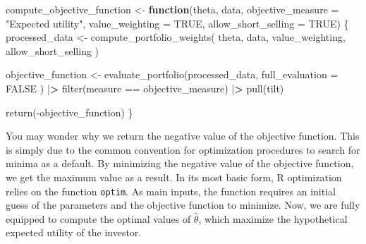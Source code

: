 \documentclass[
]{book}
\newenvironment{Shaded}{\begin{snugshade}}{\end{snugshade}}
\newcommand{\AttributeTok}[1]{\textcolor[rgb]{0.61,0.61,0.61}{#1}}
\newcommand{\ConstantTok}[1]{\textcolor[rgb]{0,0,0}{#1}}
\newcommand{\ControlFlowTok}[1]{\textcolor[rgb]{0.27,0.27,0.27}{\textbf{#1}}}
\newcommand{\ErrorTok}[1]{\textcolor[rgb]{0.14,0.14,0.14}{\textbf{#1}}}
\newcommand{\FunctionTok}[1]{\textcolor[rgb]{0,0,0}{#1}}
\newcommand{\NormalTok}[1]{#1}
\newcommand{\OtherTok}[1]{\textcolor[rgb]{0.37,0.37,0.37}{#1}}
\newcommand{\SpecialCharTok}[1]{\textcolor[rgb]{0,0,0}{#1}}
\newcommand{\StringTok}[1]{\textcolor[rgb]{0.5,0.5,0.5}{#1}}
\begin{document}
\begin{Shaded}
\begin{Highlighting}[]
\NormalTok{compute\_objective\_function }\OtherTok{\textless{}{-}} \ControlFlowTok{function}\NormalTok{(theta,}
\NormalTok{                                       data,}
                                       \AttributeTok{objective\_measure =} \StringTok{"Expected utility"}\NormalTok{,}
                                       \AttributeTok{value\_weighting =} \ConstantTok{TRUE}\NormalTok{,}
                                       \AttributeTok{allow\_short\_selling =} \ConstantTok{TRUE}\NormalTok{) \{}
\NormalTok{  processed\_data }\OtherTok{\textless{}{-}} \FunctionTok{compute\_portfolio\_weights}\NormalTok{(}
\NormalTok{    theta,}
\NormalTok{    data,}
\NormalTok{    value\_weighting,}
\NormalTok{    allow\_short\_selling}
\NormalTok{  )}

\NormalTok{  objective\_function }\OtherTok{\textless{}{-}} \FunctionTok{evaluate\_portfolio}\NormalTok{(processed\_data,}
    \AttributeTok{full\_evaluation =} \ConstantTok{FALSE}
\NormalTok{  ) }\SpecialCharTok{|}\ErrorTok{\textgreater{}}
    \FunctionTok{filter}\NormalTok{(measure }\SpecialCharTok{==}\NormalTok{ objective\_measure) }\SpecialCharTok{|}\ErrorTok{\textgreater{}}
    \FunctionTok{pull}\NormalTok{(tilt)}

  \FunctionTok{return}\NormalTok{(}\SpecialCharTok{{-}}\NormalTok{objective\_function)}
\NormalTok{\}}
\end{Highlighting}
\end{Shaded}

You may wonder why we return the negative value of the objective function. This is simply due to the common convention for optimization procedures to search for minima as a default. By minimizing the negative value of the objective function, we get the maximum value as a result.
In its most basic form, R optimization relies on the function \texttt{optim}. As main inputs, the function requires an initial guess of the parameters and the objective function to minimize. Now, we are fully equipped to compute the optimal values of \(\hat\theta\), which maximize the hypothetical expected utility of the investor.

\begin{Shaded}
\end{Shaded}
\end{document}
